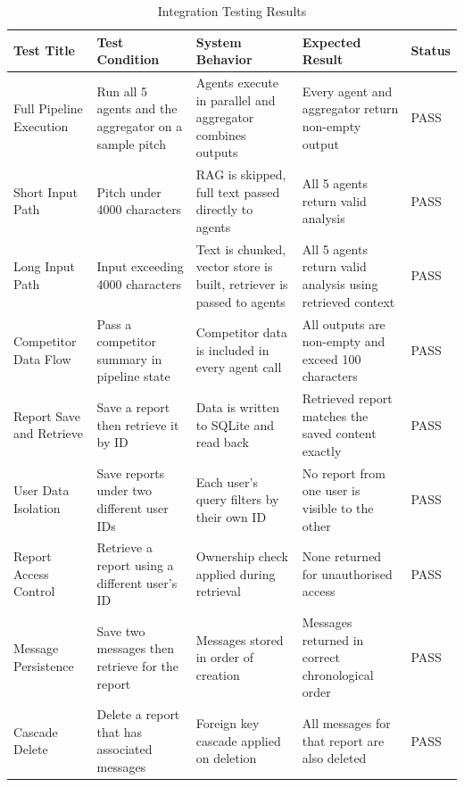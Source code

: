 \begin{table}[h]
\centering
\begin{tabular}{|p{3.2cm}|p{3cm}|p{3.5cm}|p{3.5cm}|p{1.8cm}|}
\hline
\textbf{Test Title} & \textbf{Test Condition} & \textbf{System Behavior} & \textbf{Expected Result} & \textbf{Status} \\
\hline
Full Pipeline Execution & Run all 5 agents and the aggregator on a sample pitch & Agents execute in parallel and aggregator combines outputs & Every agent and aggregator return non-empty output & PASS \\
\hline
Short Input Path & Pitch under 4000 characters & RAG is skipped, full text passed directly to agents & All 5 agents return valid analysis & PASS \\
\hline
Long Input Path & Input exceeding 4000 characters & Text is chunked, vector store is built, retriever is passed to agents & All 5 agents return valid analysis using retrieved context & PASS \\
\hline
Competitor Data Flow & Pass a competitor summary in pipeline state & Competitor data is included in every agent call & All outputs are non-empty and exceed 100 characters & PASS \\
\hline
Report Save and Retrieve & Save a report then retrieve it by ID & Data is written to SQLite and read back & Retrieved report matches the saved content exactly & PASS \\
\hline
User Data Isolation & Save reports under two different user IDs & Each user's query filters by their own ID & No report from one user is visible to the other & PASS \\
\hline
Report Access Control & Retrieve a report using a different user's ID & Ownership check applied during retrieval & None returned for unauthorised access & PASS \\
\hline
Message Persistence & Save two messages then retrieve for the report & Messages stored in order of creation & Messages returned in correct chronological order & PASS \\
\hline
Cascade Delete & Delete a report that has associated messages & Foreign key cascade applied on deletion & All messages for that report are also deleted & PASS \\
\hline
\end{tabular}
\caption{Integration Testing Results}
\end{table}
